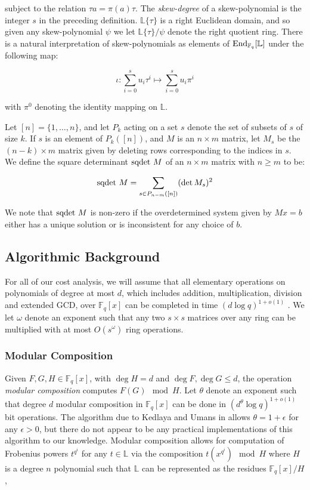 \documentclass[sigconf]{acmart}
\newcommand{\F}{\mathbb{F}}
\renewcommand{\L}{\mathbb{L}}
\newcommand{\sqdet}{\textnormal{sqdet }}
\begin{document}
subject to the relation $\tau a = \pi(a) \tau$. The \textit{skew-degree} of a skew-polynomial is the integer $s$ in the preceding definition. $\L\{\tau\}$ is a right Euclidean domain, and so given any skew-polynomial $\psi$ we let $\L\{ \tau \}/\psi$ denote the right quotient ring. 
There is a natural interpretation of skew-polynomials as elements of $\textnormal{End}_{\F_q}[\L]$ under the following map:

\begin{equation*}
    \iota : \sum_{i=0}^su_i\tau^i \mapsto \sum_{i=0}^su_i\pi^i 
\end{equation*}

with $\pi^0$ denoting the identity mapping on $\L$.

Let $[n] = \{1, \ldots, n \} $, and let $P_k$ acting on a set $s$ denote the set of subsets of $s$ of size $k$. If $s$ is an element of $P_k([n])$, and $M$ is an $n \times m$ matrix, let $M_s$ be the $(n - k) \times m$ matrix given by deleting rows corresponding to the indices in $s$. We define the square determinant $\sqdet M$ of an $n \times m$ matrix with $n \geq m$ to be:

\begin{equation*}
    \sqdet M = \sum_{s \in P_{n-m}([n])} (\det M_{s})^2
\end{equation*}

We note that $\sqdet M$ is non-zero if the overdetermined system given by $Mx = b$ either has a unique solution or is inconsistent for any choice of $b$.

\subsection{Algorithmic Background}

For all of our cost analysis, we will assume that all elementary operations on polynomials of degree at most $d$, which includes addition, multiplication, division and extended GCD, over $\F_q[x]$ can be completed in time $(d \log q)^{1 + o(1)}$ \cite{vonzurgathen_gerhard_2013}. We let $\omega$ denote an exponent such that any two $s\times s$ matrices over any ring can be multiplied with at most $O(s^{\omega})$ ring operations. 

\subsubsection{Modular Composition} 
Given $F,G,H \in \F_q[x]$, with $\deg H = d$ and $\deg F, \deg G \leq d$, the operation \textit{modular composition} computes $F(G) \mod H$. Let $\theta$ denote an exponent such that degree $d$ modular composition in $\F_q[x]$ can be done in $(d^{\theta} \log q)^{1 + o(1)}$ bit operations. The algorithm due to Kedlaya and Umans in \cite{kedlaya_umans} allows $\theta = 1 + \epsilon$ for any $\epsilon > 0$, but there do not appear to be any practical implementations of this algorithm to our knowledge. Modular composition allows for computation of Frobenius powers $t^{q^i}$ for any $t \in \L$ via the composition $t(x^{q^i}) \mod H$ where $H$ is a degree $n$ polynomial such that $\L$ can be represented as the residues $\F_q[x]/H$, 
\end{document}
